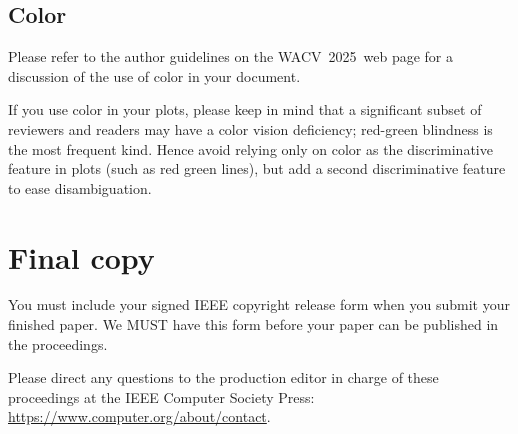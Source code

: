 \documentclass[10pt,twocolumn,letterpaper]{article}
\def\confName{WACV}
\def\confYear{2025}
\begin{document}
\subsection{Color}

Please refer to the author guidelines on the \confName\ \confYear\ web page for a discussion of the use of color in your document.

If you use color in your plots, please keep in mind that a significant subset of reviewers and readers may have a color vision deficiency; red-green blindness is the most frequent kind.
Hence avoid relying only on color as the discriminative feature in plots (such as red \vs green lines), but add a second discriminative feature to ease disambiguation.

\section{Final copy}

You must include your signed IEEE copyright release form when you submit your finished paper.
We MUST have this form before your paper can be published in the proceedings.

Please direct any questions to the production editor in charge of these proceedings at the IEEE Computer Society Press:
\url{https://www.computer.org/about/contact}.



{\small


}
\end{document}
